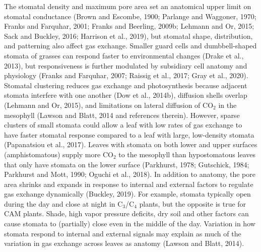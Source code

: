\documentclass[utf8]{frontiersSCNS}
\begin{document}
The stomatal density and maximum pore area set an anatomical upper limit
on stomatal conductance (Brown and Escombe, 1900; Parlange and Waggoner,
1970; Franks and Farquhar, 2001; Franks and Beerling, 2009b; Lehmann and
Or, 2015; Sack and Buckley, 2016; Harrison et al., 2019), but stomatal
shape, distribution, and patterning also affect gas exchange. Smaller
guard cells and dumbbell-shaped stomata of grasses can respond faster to
environmental changes (Drake et al., 2013), but responsiveness is
further modulated by subsidiary cell anatomy and physiology (Franks and
Farquhar, 2007; Raissig et al., 2017; Gray et al., 2020). Stomatal
clustering reduces gas exchange and photosynthesis because adjacent
stomata interfere with one another (Dow et al., 2014b), diffusion shells
overlap (Lehmann and Or, 2015), and limitations on lateral diffusion of
CO\(_2\) in the mesophyll (Lawson and Blatt, 2014 and references
therein). However, sparse clusters of small stomata could allow a leaf
with low rates of gas exchange to have faster stomatal response compared
to a leaf with large, low-density stomata (Papanatsiou et al., 2017).
Leaves with stomata on both lower and upper surfaces (amphistomatous)
supply more CO\(_2\) to the mesophyll than hypostomatous leaves that
only have stomata on the lower surface (Parkhurst, 1978; Gutschick,
1984; Parkhurst and Mott, 1990; Oguchi et al., 2018). In addition to
anatomy, the pore area shrinks and expands in response to internal and
external factors to regulate gas exchange dynamically (Buckley, 2019).
For example, stomata typically open during the day and close at night in
C\(_3\)/C\(_4\) plants, but the opposite is true for CAM plants. Shade,
high vapor pressure deficits, dry soil and other factors can cause
stomata to (partially) close even in the middle of the day. Variation in
how stomata respond to internal and external signals may explain as much
of the variation in gas exchange across leaves as anatomy (Lawson and
Blatt, 2014).
\end{document}
